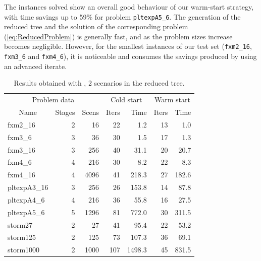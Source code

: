 The instances solved show an overall good behaviour of our warm-start
strategy, with time savings up to 59\% for problem {\tt pltexpA5\_6}.
The generation of the reduced tree and the solution of the corresponding
problem (\ref{eq:ReducedProblem}) is generally fast, and as the problem 
sizes increase becomes negligible. However, for the smallest instances
of our test set ({\tt fxm2\_16}, {\tt fxm3\_6} and {\tt fxm4\_6}), it
is noticeable and consumes the savings produced by using an advanced
iterate.

\begin{table}[ht]
  \begin{center}
    \begin{tabular}{|l|r|r||r|r||r|r|} \hline
      \multicolumn{3}{|c||}{Problem data}&\multicolumn{2}{c||}{Cold start}&\multicolumn{2}{c|}{Warm start}\\
      \multicolumn{1}{|c|}{Name} & Stages & Scens & Iters & Time & Iters & Time \\ \hline \hline
fxm2\_16     &  2 &   16 &  22 &   1.2 & 13 &   1.0 \\
fxm3\_6      &  3 &   36 &  30 &   1.5 & 17 &   1.3 \\
fxm3\_16     &  3 &  256 &  40 &  31.1 & 20 &  20.7 \\
fxm4\_6      &  4 &  216 &  30 &   8.2 & 22 &   8.3 \\
fxm4\_16     &  4 & 4096 &  41 & 218.3 & 27 & 182.6 \\ \hline
pltexpA3\_16 &  3 &  256 &  26 & 153.8 & 14 &  87.8 \\
pltexpA4\_6  &  4 &  216 &  36 &  55.8 & 16 &  27.5 \\
pltexpA5\_6  &  5 & 1296 &  81 & 772.0 & 30 & 311.5 \\ \hline
storm27      &  2 &   27 &  41 &  95.4 & 22 &  53.2 \\
storm125     &  2 &  125 &  73 & 107.3 & 36 &  69.1 \\
storm1000    &  2 & 1000 & 107 &1498.3 & 45 & 831.5 \\ \hline
    \end{tabular}
    \caption{Results obtained with \HOPDM, 2 scenarios in the reduced tree.}
    \label{table:hopdm}
  \end{center} \vspace{-3ex}
\end{table}

